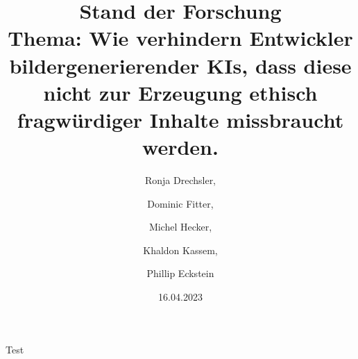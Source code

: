 \documentclass[12pt]{article}
\title{Stand der Forschung \\[1ex] \large Thema: Wie verhindern Entwickler bildergenerierender KIs, dass diese nicht zur Erzeugung ethisch fragwürdiger Inhalte missbraucht werden.}
\date{16.04.2023}
\author{Ronja Drechsler, \and Dominic Fitter, \and Michel Hecker, \and Khaldon Kassem, \and Phillip Eckstein}
\begin{document}
Test
\end{document}
